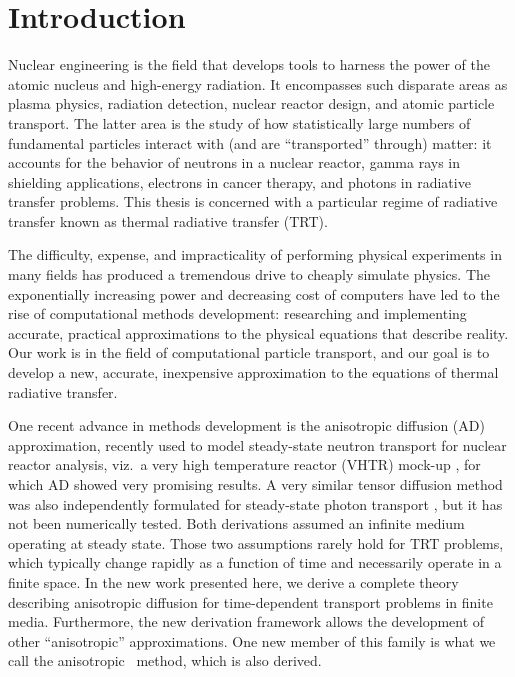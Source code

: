 
\chapter{Introduction}\label{chap:introduction}

Nuclear engineering is the field that develops tools to harness the power of the
atomic nucleus and high-energy radiation. It encompasses such
disparate areas as plasma physics, radiation detection, nuclear reactor design,
and atomic particle transport. The latter area is the study of how
statistically large numbers of fundamental particles interact with (and are
``transported'' through) matter: it
accounts for the behavior of neutrons in a nuclear reactor,
gamma rays in shielding applications, electrons in cancer therapy, and photons
in radiative transfer problems. This thesis is concerned with a
particular regime of radiative transfer known as thermal radiative transfer
(TRT).

The difficulty, expense, and impracticality of performing physical
experiments in many fields has produced a tremendous drive to cheaply
simulate physics. The exponentially increasing power and decreasing cost of
computers have led to the rise of computational methods development:
researching and implementing accurate, practical approximations to the physical
equations that describe reality. Our work is in the field of computational
particle transport, and our goal is to develop a new, accurate, inexpensive
approximation to the equations of thermal radiative transfer.

One recent advance in methods development is the anisotropic diffusion (AD)
approximation, recently used to model steady-state neutron transport for
nuclear reactor analysis, viz.~a very high temperature reactor
(VHTR) mock-up \cite{Lar2009c,Tra2011}, for which AD showed very promising
results. A very similar tensor diffusion
method was also independently formulated for steady-state photon transport
\cite{Mor2007}, but it has not been numerically tested.
Both derivations assumed an infinite medium operating at steady state.
Those two assumptions rarely hold for TRT problems, which typically change
rapidly as a
function of time and necessarily operate in a finite space. In the new
work presented here, we derive a complete theory describing anisotropic
diffusion for time-dependent transport problems in finite media. Furthermore,
the new derivation framework allows the development of other ``anisotropic''
approximations. One new member of this family is what we call the anisotropic
\Pone\ method, which is also derived.

